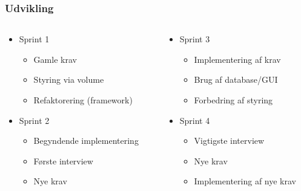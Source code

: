 \begin{frame}
\frametitle{Udvikling}

\begin{columns}

\begin{column}{.48\textwidth}
\begin{itemize}
\item Sprint 1
\begin{itemize}
\item Gamle krav
\item Styring via volume
\item Refaktorering (framework)
\end{itemize}
\item Sprint 2
\begin{itemize}
\item Begyndende implementering
\item Første interview
\item Nye krav
\end{itemize}
\end{itemize}
\end{column}

\begin{column}{.48\textwidth}
\begin{itemize}
\item Sprint 3
\begin{itemize}
\item Implementering af krav
\item Brug af database/GUI
\item Forbedring af styring
\end{itemize}
\item Sprint 4
\begin{itemize}
\item Vigtigste interview
\item Nye krav
\item Implementering af nye krav
\end{itemize}
\end{itemize}
\end{column}

\end{columns}

\end{frame}

